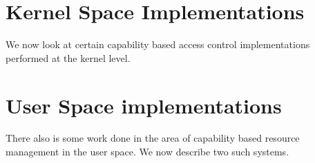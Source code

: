 \documentclass[conference]{IEEEtran}
\begin{document}
	

\section{Kernel Space Implementations}
We now look at certain capability based access control implementations performed at the kernel level.
 
 



\hfill
\section{User Space implementations}
There also is some work done in the area of capability based resource management in the user space. We now describe two such systems. 
	
	










\end{document}
